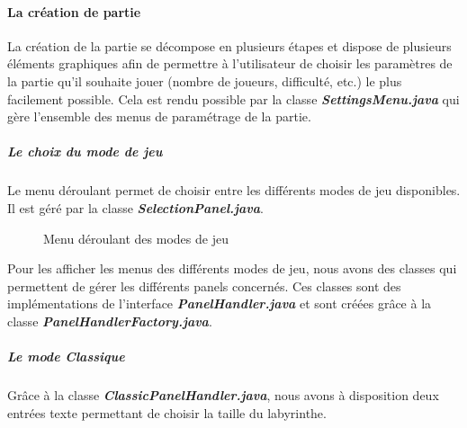 \paragraph{La création de partie}

La création de la partie se décompose en plusieurs étapes et dispose de plusieurs éléments graphiques afin de permettre à l'utilisateur de choisir les paramètres de la partie qu'il souhaite jouer (nombre de joueurs, difficulté, etc.) le plus facilement possible. Cela est rendu possible par la classe \textbf{\textit{SettingsMenu.java}} qui gère l'ensemble des menus de paramétrage de la partie.

\subparagraph*{Le choix du mode de jeu}

Le menu déroulant permet de choisir entre les différents modes de jeu disponibles. Il est géré par la classe \textbf{\textit{SelectionPanel.java}}.

\begin{figure}[h!]
    \centering
    \caption{Menu déroulant des modes de jeu}
    \label{fig:ModeSelection}
\end{figure}
\FloatBarrier

Pour les afficher les menus des différents modes de jeu, nous avons des classes qui permettent de gérer les différents panels concernés. Ces classes sont des implémentations de l'interface  \textbf{\textit{PanelHandler.java}} et sont créées grâce à la classe  \textbf{\textit{PanelHandlerFactory.java}}.

\subparagraph*{Le mode Classique}

Grâce à la classe \textbf{\textit{ClassicPanelHandler.java}}, nous avons à disposition deux entrées texte permettant de choisir la taille du labyrinthe.

